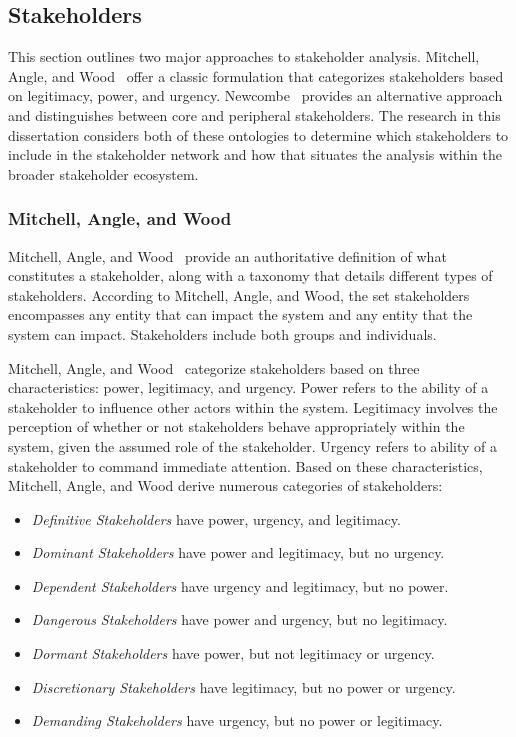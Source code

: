 \subsection{Stakeholders}

This section outlines two major approaches to stakeholder analysis. Mitchell, Angle, and Wood~\cite{mitchell} offer a classic formulation that categorizes stakeholders based on legitimacy, power, and urgency. Newcombe~\cite{newcombe} provides an alternative approach and distinguishes between core and peripheral stakeholders. The research in this dissertation considers both of these ontologies to determine which stakeholders to include in the stakeholder network and how that situates the analysis within the broader stakeholder ecosystem.

\subsubsection{Mitchell, Angle, and Wood}

Mitchell, Angle, and Wood~\cite{mitchell} provide an authoritative definition of what constitutes a stakeholder, along with a taxonomy that details different types of stakeholders. According to Mitchell, Angle, and Wood, the set stakeholders encompasses any entity that can impact the system and any entity that the system can impact. Stakeholders include both groups and individuals. 

Mitchell, Angle, and Wood~\cite{mitchell} categorize stakeholders based on three characteristics: power, legitimacy, and urgency. Power refers to the ability of a stakeholder to influence other actors within the system. Legitimacy involves the perception of whether or not stakeholders behave appropriately within the system, given the assumed role of the stakeholder. Urgency refers to ability of a stakeholder to command immediate attention. Based on these characteristics, Mitchell, Angle, and Wood derive numerous categories of stakeholders:

\begin{itemize}
    \item \emph{Definitive Stakeholders} have power, urgency, and legitimacy.
    \item \emph{Dominant Stakeholders} have power and legitimacy, but no urgency.
    \item \emph{Dependent Stakeholders} have urgency and legitimacy, but no power.
    \item \emph{Dangerous Stakeholders} have power and urgency, but no legitimacy.
    \item \emph{Dormant Stakeholders} have power, but not legitimacy or urgency.
    \item \emph{Discretionary Stakeholders} have legitimacy, but no power or urgency.
    \item \emph{Demanding Stakeholders} have urgency, but no power or legitimacy.
\end{itemize}

